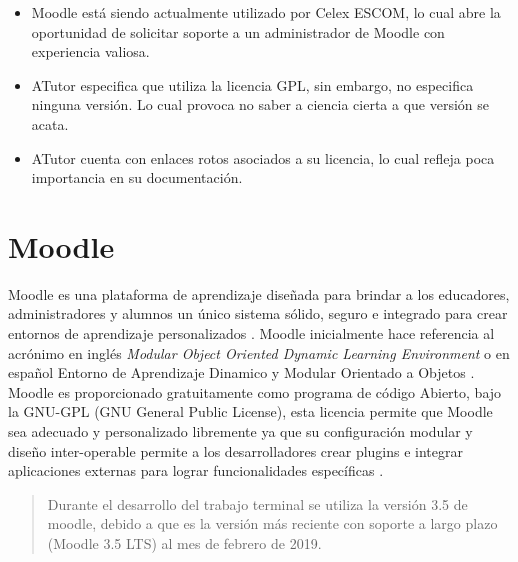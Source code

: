     \begin{itemize}
        \item Moodle está siendo actualmente utilizado por Celex ESCOM, lo cual abre la oportunidad de solicitar soporte a un administrador de Moodle con experiencia valiosa.
        \item ATutor especifica que utiliza la licencia GPL, sin embargo, no especifica ninguna versión. Lo cual provoca no saber a ciencia cierta a que versión se acata.
        \item ATutor cuenta con enlaces rotos asociados a su licencia, lo cual refleja poca importancia en su documentación.
    \end{itemize}
\clearpage    
\section{Moodle}

Moodle es una plataforma de aprendizaje diseñada para brindar a los educadores, administradores y alumnos un único sistema sólido, seguro e integrado para crear entornos de aprendizaje personalizados \cite{aboutMoodle}. Moodle inicialmente hace referencia al acrónimo en inglés {\it Modular Object Oriented Dynamic Learning Environment} o en español Entorno de Aprendizaje Dinamico y Modular Orientado a Objetos \cite{aboutMoodle19}.\\

\noindent Moodle es proporcionado gratuitamente como programa de código Abierto, bajo la GNU-GPL (GNU General Public License), esta licencia permite que Moodle sea adecuado y personalizado libremente ya que su configuración modular y diseño inter-operable permite a los desarrolladores crear plugins e integrar aplicaciones externas para lograr funcionalidades específicas \cite{aboutMoodle}.


\begin{quote}
    Durante el desarrollo del trabajo terminal se utiliza la versión 3.5 de moodle, debido a que es la versión más reciente con soporte a largo plazo (Moodle 3.5 LTS) al mes de febrero de 2019. \cite{moodleHistorial}
\end{quote}
